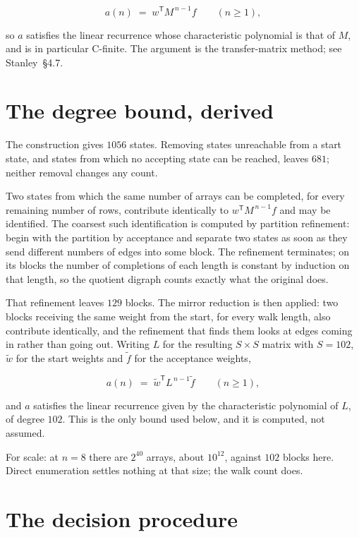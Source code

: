 \documentclass[11pt]{article}
\theoremstyle{definition}
\begin{document}
\[a(n) \;=\; w^{\mathsf T} M^{\,n-1} f \qquad (n \ge 1),\]

so $a$ satisfies the linear recurrence whose characteristic polynomial is that of $M$, and is in particular C-finite. The argument is the transfer-matrix method; see Stanley~\S4.7.

\section{The degree bound, derived}

The construction gives $1056$ states. Removing states unreachable from a start state, and states from which no accepting state can be reached, leaves $681$; neither removal changes any count.

Two states from which the same number of arrays can be completed, for every remaining number of rows, contribute identically to $w^{\mathsf T}M^{\,n-1}f$ and may be identified. The coarsest such identification is computed by partition refinement: begin with the partition by acceptance and separate two states as soon as they send different numbers of edges into some block. The refinement terminates; on its blocks the number of completions of each length is constant by induction on that length, so the quotient digraph counts exactly what the original does.

That refinement leaves $129$ blocks. The mirror reduction is then applied: two blocks receiving the same weight from the start, for every walk length, also contribute identically, and the refinement that finds them looks at edges coming in rather than going out. Writing $L$ for the resulting $S \times S$ matrix with $S = 102$, $\tilde w$ for the start weights and $\tilde f$ for the acceptance weights,

\[a(n) \;=\; \tilde w^{\mathsf T} L^{\,n-1} \tilde f \qquad (n \ge 1),\]

and $a$ satisfies the linear recurrence given by the characteristic polynomial of $L$, of degree $102$. This is the only bound used below, and it is computed, not assumed.

For scale: at $n = 8$ there are $2^{40}$ arrays, about $10^{12}$, against $102$ blocks here. Direct enumeration settles nothing at that size; the walk count does.

\section{The decision procedure}
\end{document}
